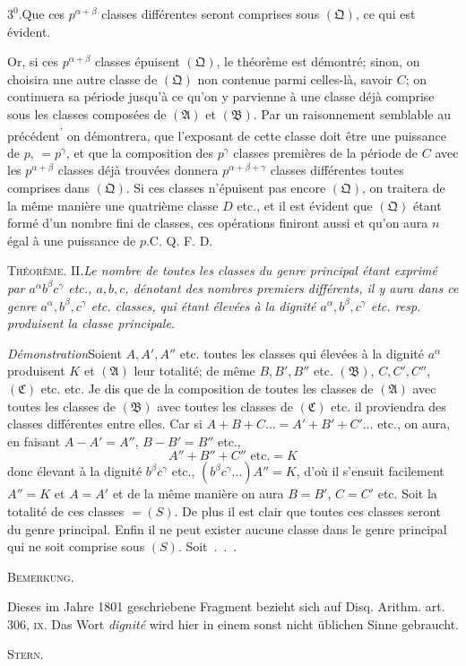 $3^0$.\quad Que ces $p^{\alpha+\beta}$ classes différentes seront comprises sous $(\mathfrak Q)$, ce qui est évident.

Or, si ces $p^{\alpha+\beta}$ classes épuisent $(\mathfrak Q)$, le théorème est démontré; sinon, on choisira nne autre classe de $(\mathfrak Q)$ non contenue parmi celles-là, savoir $C$; on continuera sa période jusqu’à ce qu’on y parvienne à une classe déjà comprise sous les classes composées de $(\mathfrak A)$ et $(\mathfrak B)$. Par un raisonnement semblable au précédent\textsuperscript{'} on démontrera, que l’exposant de cette classe doit être une puissance de $p$, $=p^\gamma$, et que la composition des $p^\gamma$ classes premières de la période de $C$ avec les $p^{\alpha+\beta}$ classes déjà trouvées donnera $p^{\alpha+\beta+\gamma}$ classes différentes toutes comprises dans $(\mathfrak Q)$. Si ces classes n’épuisent pas encore $(\mathfrak Q)$, on traitera de la même manière une quatrième classe $D$ etc., et il est évident que $(\mathfrak Q)$ étant formé d’un nombre fini de classes, ces opérations finiront aussi et qu’on aura $n$ égal à une puissance de $p$.\quad C. Q. F. D.

\par\bigskip
{}
\textsc{Théorème. II.}\quad\emph{Le nombre de toutes les classes du genre principal étant exprimé par $a^\alpha b^\beta c^\gamma$ etc., $a,b,c$, dénotant des nombres premiers différents, il y aura dans ce genre $a^\alpha,b^\beta,c^\gamma$ etc. classes, qui étant élevées à la dignité $a^\alpha,b^\beta,c^\gamma$ etc. resp. produisent la classe principale.}

\emph{Démonstration}\quad Soient $A,A',A''$ etc. toutes les classes qui élevées à la dignité $a^\alpha$ produisent $K$ et $(\mathfrak A)$ leur totalité; de même $B,B',B''$ etc. $(\mathfrak B)$, $C,C',C''$, $(\mathfrak C)$ etc. etc. Je dis que de la composition de toutes les classes de $(\mathfrak A)$ avec toutes les classes de $(\mathfrak B)$ avec toutes les classes de $(\mathfrak C)$ etc. il proviendra des classes différentes entre elles. Car si $A+B+C\dots=A'+B'+C'\dots$ etc., on aura, en faisant $A-A'=A''$, $B-B'=B''$ etc.,
\[
A''+B''+C''\text{ etc.}=K
\]
donc élevant à la dignité $b^\beta c^\gamma$ etc., $(b^\beta c^\gamma\dots)A''=K$, d’où il s’ensuit facilement
$A''=K$ et $A=A'$ et de la même manière on aura $B=B'$, $C=C'$ etc. Soit la totalité de ces classes $=(S)$. De plus il est clair que toutes ces classes seront du genre principal. Enfin il ne peut exister aucune classe dans le genre principal qui ne soit comprise sous $(S)$. Soit\ .\ .\ .

\par\bigskip
{}
\begin{center}\textsc{Bemerkung.}\end{center}
\begingroup\small
Dieses im Jahre 1801 geschriebene Fragment bezieht sich auf Disq. Arithm. art. 306, \textsc{ix}. Das Wort \emph{dignité} wird hier in einem sonst nicht üblichen Sinne gebraucht.
\begin{flushright}\textsc{Stern}.\end{flushright}
\endgroup
{}

